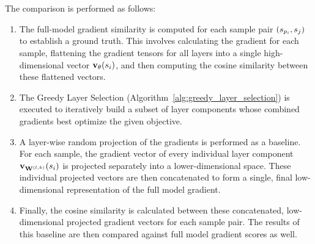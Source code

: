 \\\\
The comparison is performed as follows:
\begin{enumerate}
    \item The {full-model gradient similarity} is computed for each sample pair $(\spi, \sj)$ to establish a ground truth. This involves calculating the gradient for each sample, flattening the gradient tensors for all layers into a single high-dimensional vector $\vXsi[\theta]$, and then computing the cosine similarity between these flattened vectors.
    \item The Greedy Layer Selection (Algorithm~\ref{alg:greedy_layer_selection}) is executed to iteratively build a subset of layer components whose combined gradients best optimize the given objective.
    \item A layer-wise random projection of the gradients is performed as a baseline. For each sample, the gradient vector of every individual layer component $\vXsi[\Wlk]$ is projected separately into a lower-dimensional space. These individual projected vectors are then concatenated to form a single, final low-dimensional representation of the full model gradient.
    \item Finally, the cosine similarity is calculated between these concatenated, low-dimensional projected gradient vectors for each sample pair. The results of this baseline are then compared against full model gradient scores as well. 
\end{enumerate}